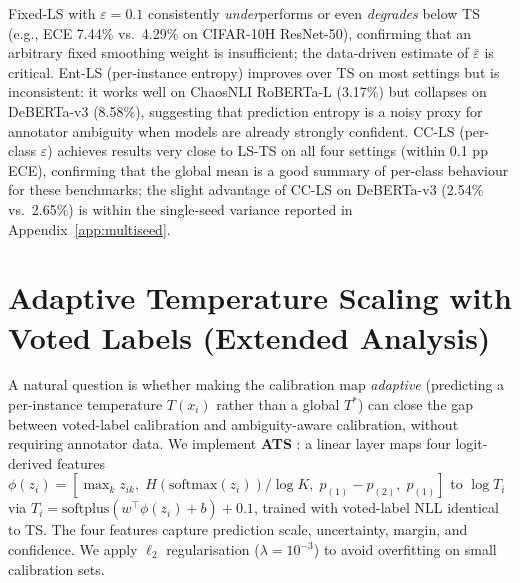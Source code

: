 \documentclass[10pt,journal,compsoc]{IEEEtran}
\begin{document}
Fixed-LS with $\varepsilon{=}0.1$ consistently \emph{under}performs or even \emph{degrades} below TS (e.g., ECE 7.44\% vs.\ 4.29\% on CIFAR-10H ResNet-50), confirming that an arbitrary fixed smoothing weight is insufficient; the data-driven estimate of $\bar\varepsilon$ is critical.
Ent-LS (per-instance entropy) improves over TS on most settings but is inconsistent: it works well on ChaosNLI RoBERTa-L (3.17\%) but collapses on DeBERTa-v3 (8.58\%), suggesting that prediction entropy is a noisy proxy for annotator ambiguity when models are already strongly confident.
CC-LS (per-class $\varepsilon$) achieves results very close to LS-TS on all four settings (within 0.1 pp ECE), confirming that the global mean is a good summary of per-class behaviour for these benchmarks; the slight advantage of CC-LS on DeBERTa-v3 (2.54\% vs.\ 2.65\%) is within the single-seed variance reported in Appendix~\ref{app:multiseed}.

\section{Adaptive Temperature Scaling with Voted Labels (Extended Analysis)}
\label{app:ats}

A natural question is whether making the calibration map \emph{adaptive} (predicting a per-instance temperature $T(x_i)$ rather than a global $T^*$) can close the gap between voted-label calibration and ambiguity-aware calibration, without requiring annotator data.  We implement \textbf{ATS} \cite{joy2023sample}: a linear layer maps four logit-derived features $\phi(z_i) = [\max_k z_{ik},\; H(\mathrm{softmax}(z_i))/\log K,\; p_{(1)}-p_{(2)},\; p_{(1)}]$ to $\log T_i$ via $T_i = \mathrm{softplus}(w^\top\phi(z_i)+b)+0.1$, trained with voted-label NLL identical to TS.  The four features capture prediction scale, uncertainty, margin, and confidence.  We apply $\ell_2$ regularisation ($\lambda=10^{-3}$) to avoid overfitting on small calibration sets.
\end{document}
